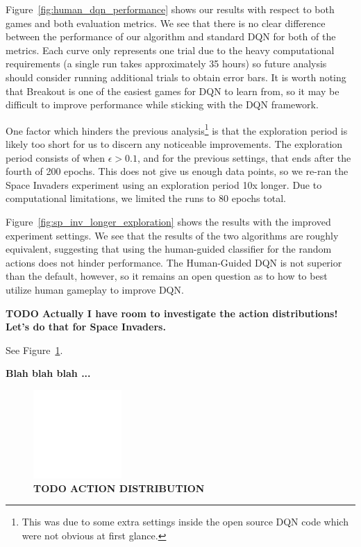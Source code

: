 \documentclass[letterpaper, 10pt, conference]{ieeeconf}
\begin{document}
Figure~\ref{fig:human_dqn_performance} shows our results with respect to both
games and both evaluation metrics. We see that there is no clear difference
between the performance of our algorithm and standard DQN for both of the
metrics. Each curve only represents one trial due to the heavy computational
requirements (a single run takes approximately 35 hours) so future analysis
should consider running additional trials to obtain error bars. It is worth
noting that Breakout is one of the easiest games for DQN to learn from, so it
may be difficult to improve performance while sticking with the DQN framework.

One factor which hinders the previous analysis\footnote{This was due to some
extra settings inside the open source DQN code which were not obvious at first
glance.} is that the exploration period is likely too short for us to discern
any noticeable improvements. The exploration period consists of when
$\epsilon>0.1$, and for the previous settings, that ends after the fourth of 200
epochs. This does not give us enough data points, so we re-ran the Space
Invaders experiment using an exploration period 10x longer. Due to computational
limitations, we limited the runs to 80 epochs total.

Figure~\ref{fig:sp_inv_longer_exploration} shows the results with the improved
experiment settings. We see that the results of the two algorithms are roughly
equivalent, suggesting that using the human-guided classifier for the random
actions does not hinder performance. The Human-Guided DQN is not superior than
the default, however, so it remains an open question as to how to best utilize
human gameplay to improve DQN.

\textbf{TODO Actually I have room to investigate the action distributions! Let's
do that for Space Invaders.} 

See Figure~\ref{fig:actions_taken}.

\textbf{Blah blah blah ...}

\begin{figure}[t]
\centering
\includegraphics[width=0.30\textwidth]{figures/empty.png}
\caption{\footnotesize
\textbf{TODO ACTION DISTRIBUTION}
}
\label{fig:actions_taken}
\end{figure}
\end{document}
